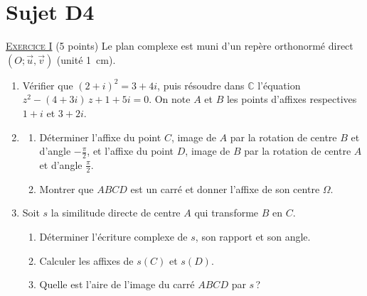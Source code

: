 \newpage
\section{Sujet D4}
\noindent \underline{\textsc{Exercice I}} (5 points) \newline
Le plan complexe est muni d'un rep\`ere orthonorm\'e direct $(O ; \vec{u}, \vec{v})$ (unit\'e 1~cm).
\begin{enumerate}
      \item V\'erifier que $(2 + i)^2 = 3 + 4i$, puis r\'esoudre dans $\mathbb{C}$ l'\'equation
            $z^2 - (4 + 3i)\,z + 1 + 5i = 0$. On note $A$ et $B$ les points d'affixes respectives $1 + i$ et $3 + 2i$.
      \item \begin{enumerate}
            \item D\'eterminer l'affixe du point $C$, image de $A$ par la rotation de centre $B$ et d'angle $-\frac{\pi}{2}$,
                  et l'affixe du point $D$, image de $B$ par la rotation de centre $A$ et d'angle $\frac{\pi}{2}$.
            \item Montrer que $ABCD$ est un carr\'e et donner l'affixe de son centre $\Omega$.
            \end{enumerate}
      \item Soit $s$ la similitude directe de centre $A$ qui transforme $B$ en $C$.
            \begin{enumerate}
            \item D\'eterminer l'\'ecriture complexe de $s$, son rapport et son angle.
            \item Calculer les affixes de $s(C)$ et $s(D)$.
            \item Quelle est l'aire de l'image du carr\'e $ABCD$ par $s$\,?
            \end{enumerate}
\end{enumerate}

